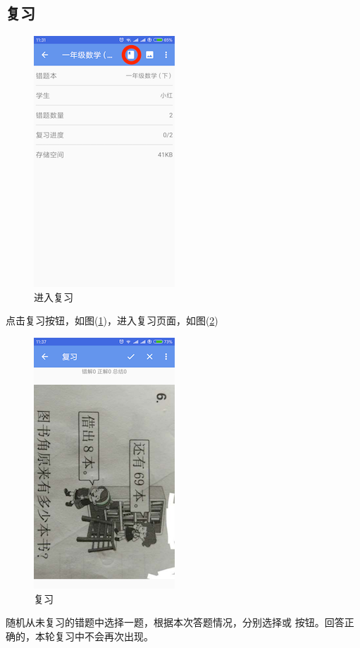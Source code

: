 \subsection{复习}
\begin{figure}[H]
	\centering
	\includegraphics{img/24.png}
	\caption{进入复习}
	\label{img24}
\end{figure}

点击复习按钮，如图(\ref{img24})，进入复习页面，如图(\ref{img25})

\begin{figure}[H]
	\centering
	\includegraphics{img/25.png}
	\caption{复习}
	\label{img25}
\end{figure}

随机从未复习的错题中选择一题，根据本次答题情况，分别选择\Checkmark 或 \XSolid 按钮。回答正确的，本轮复习中不会再次出现。


